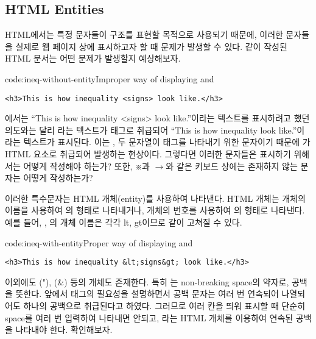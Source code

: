 \subsection*{HTML Entities}

HTML에서는 특정 문자들이 구조를 표현할 목적으로 사용되기 때문에, 이러한 문자들을 실제로 웹 페이지 상에 표시하고자 할 때 문제가 발생할 수 있다. \와 같이 작성된 HTML 문서는 어떤 문제가 발생할지 예상해보자.

\begin{code}{code:ineq-without-entity}{Improper way of displaying \cd{<} and \cd{>}}
\begin{verbatim}
<h3>This is how inequality <signs> look like.</h3>
\end{verbatim}
\end{code}

에서는 ``This is how inequality <signs> look like.''이라는 텍스트를 표시하려고 했던 의도와는 달리 라는 텍스트가 태그로 취급되어 ``This is how inequality look like.''이라는 텍스트가 표시된다. 이는 \cd{<}, \cd{>} 두 문자열이 태그를 나타내기 위한 문자이기 때문에 가 HTML 요소로 취급되어 발생하는 현상이다. 그렇다면 이러한 문자들은 표시하기 위해서는 어떻게 작성해야 하는가? 또한, ※과 $\rightarrow$와 같은 키보드 상에는 존재하지 않는 문자는 어떻게 작성하는가?

이러한 특수문자는 HTML 개체(entity)를 사용하여 나타낸다. HTML 개체는 개체의 이름을 사용하여 의 형태로 나타내거나, 개체의 번호를 사용하여 의 형태로 나타낸다. 예를 들어, \cd{<}, \cd{>}의 개체 이름은 각각 lt, gt이므로 \는 \와 같이 고쳐질 수 있다.

\begin{code}{code:ineq-with-entity}{Proper way of displaying \cd{<} and \cd{>}}
\begin{verbatim}
<h3>This is how inequality &lt;signs&gt; look like.</h3>
\end{verbatim}
\end{code}

\label{etc:nbsp}
이외에도 ("), (\&) 등의 개체도 존재한다. 특히 는 non-breaking space의 약자로, 공백을 뜻한다. 앞에서  태그의 필요성을 설명하면서 공백 문자는 여러 번 연속되어 나열되어도 하나의 공백으로 취급된다고 하였다. 그러므로 여러 칸을 띄워 표시할 때 단순히 space를 여러 번 입력하여 나타내면 안되고, 라는 HTML 개체를 이용하여 연속된 공백을 나타내야 한다. \를 확인해보자.

